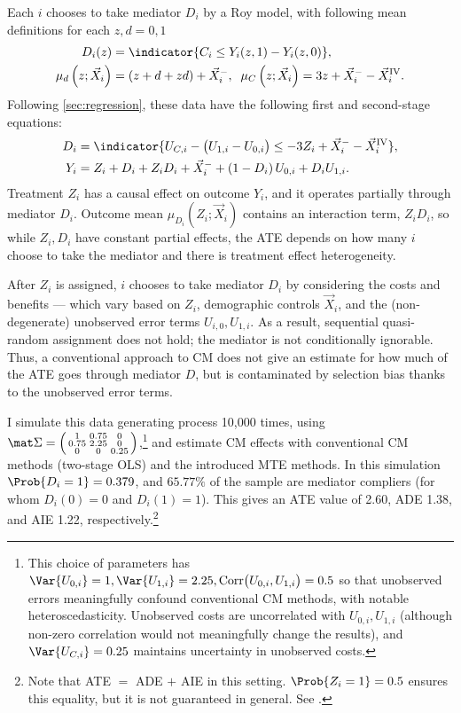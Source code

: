 Each $i$ chooses to take mediator $D_i$ by a Roy model, with following mean definitions for each $z, d = 0, 1$
\begin{align*}
    D_i(z) &= \indicator{C_i \leq Y_i(z, 1) - Y_i(z, 0)},  \\
    \mu_{d}\left(z ; \vec X_i \right) &= \left( z + d + z d \right) + \vec X_i^-,
    \;\; \mu_{C}\left(z ; \vec X_i \right) = 3z + \vec X_i^- - \vec X_i^{\text{IV}}.
\end{align*}
Following \autoref{sec:regression}, these data have the following first and second-stage equations:
\begin{align*}
    D_i &= \indicator{U_{C,i} - \big( U_{1,i} - U_{0,i} \big)
    \leq -3Z_i + \vec X_i^- - \vec X_i^{\text{IV}}},  \\
    Y_i &= Z_i + D_i + Z_i D_i + \vec X_i^-
        + \left( 1 - D_i \right) U_{0,i} + D_i U_{1,i}.
\end{align*}
Treatment $Z_i$ has a causal effect on outcome $Y_i$, and it operates partially through mediator $D_i$.
Outcome mean $\mu_{D_i}\left( Z_i; \vec X_i \right)$ contains an interaction term, $Z_i D_i$, so while $Z_i,D_i$ have constant partial effects, the ATE depends on how many $i$ choose to take the mediator and there is treatment effect heterogeneity.

After $Z_i$ is assigned, $i$ chooses to take mediator $D_i$ by considering the costs and benefits --- which vary based on $Z_i$, demographic controls $\vec X_i$, and the (non-degenerate) unobserved error terms $U_{i,0}, U_{1,i}$.
As a result, sequential quasi-random assignment does not hold; the mediator is not conditionally ignorable.
Thus, a conventional approach to CM does not give an estimate for how much of the ATE goes through mediator $D$, but is contaminated by selection bias thanks to the unobserved error terms.

I simulate this data generating process 10,000 times, using $\mat\Sigma =
\left(\begin{smallmatrix} 1 & 0.75 & 0 \\ 0.75 & 2.25 & 0 \\ 0 & 0 & 0.25 \end{smallmatrix}\right)$,\footnote{
    This choice of parameters has $\Var{U_{0,i}} = 1, \Var{U_{1,i}} = 2.25, \text{Corr}\big(U_{0,i}, U_{1,i}\big) = 0.5$ so that unobserved errors meaningfully confound conventional CM methods, with notable heteroscedasticity.
    Unobserved costs are uncorrelated with $U_{0,i}, U_{1,i}$ (although non-zero correlation would not meaningfully change the results), and $\Var{U_{C,i}} = 0.25$ maintains uncertainty in unobserved costs.
}
and estimate CM effects with conventional CM methods (two-stage OLS) and the introduced MTE methods.
In this simulation $\Prob{D_i = 1} = 0.379$, and $65.77\%$ of the sample are mediator compliers (for whom $D_i(0)=0$ and $D_i(1)=1$).
This gives an ATE value of 2.60, ADE 1.38, and AIE 1.22, respectively.\footnote{
    Note that ATE $=$ ADE $+$ AIE in this setting.
    $\Prob{Z_i=1} = 0.5$ ensures this equality, but it is not guaranteed in general.
    See .
}

